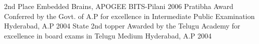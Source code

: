 \begin{cvhonors}
  \cvhonor
    {2nd Place} %
    {Embedded Brains, APOGEE} %
    {BITS-Pilani} %
    {2006} %
  \cvhonor
    {Pratibha Award} %
    {Conferred by the Govt. of A.P for excellence in Intermediate Public Examination} %
    {Hyderabad, A.P} %
    {2004} %
  \cvhonor
    {State 2nd topper} %
    {Awarded by the Telugu Academy for excellence in board exams in Telugu Medium} %
    {Hyderabad, A.P} %
    {2004} %

\end{cvhonors}
